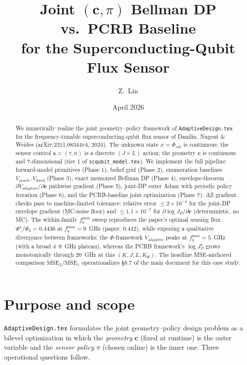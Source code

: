 \documentclass[11pt,a4paper]{article}
\title{Joint $(\bm c, \pi)$ Bellman DP vs.\ PCRB Baseline\\
       for the Superconducting-Qubit Flux Sensor}
\author{Z.\ Lin}
\date{April 2026}
\newcommand{\Phizero}{\Phi_0}
\begin{document}
\maketitle

\begin{abstract}
We numerically realize the joint geometry--policy framework of \texttt{AdaptiveDesign.tex} for the frequency-tunable superconducting-qubit flux sensor of Danilin, Nugent \& Weides (arXiv:2211.08344v4, 2024).  The unknown state $x = \Phi_{\mathrm{ext}}$ is continuous; the sensor control $\bm s = (\tau, n)$ is a discrete $(J\!\times\!L)$ action; the geometry $\bm c$ is continuous and $7$-dimensional (tier 1 of \texttt{scqubit\_model.tex}).  We implement the full pipeline: forward-model primitives (Phase 1), belief grid (Phase 2), enumeration baselines $V_{\text{oracle}}, V_{\text{fixed}}$ (Phase 3), exact memoized Bellman DP (Phase 4), envelope-theorem $\partial V_{\text{adaptive}}/\partial \bm c$ pathwise gradient (Phase 5), joint-DP outer Adam with periodic policy iteration (Phase 6), and the PCRB-baseline joint optimization (Phase 7).  All gradient checks pass to machine-limited tolerance: relative error $\le 2\!\times\!10^{-4}$ for the joint-DP envelope gradient (MC-noise floor) and $\le 1.1\!\times\!10^{-7}$ for $\partial\log J_P/\partial\bm c$ (deterministic, no MC).  The within-family $f_q^{\max}$ sweep reproduces the paper's optimal sensing flux $\Phi^\star/\Phizero = 0.4436$ at $f_q^{\max} = 9$~GHz (paper: $0.442$), while exposing a qualitative divergence between frameworks: the $\Phi$-framework $V_{\text{adaptive}}$ peaks at $f_q^{\max} = 5$~GHz (with a broad 4--9~GHz plateau), whereas the PCRB framework's $\log J_P^\star$ grows monotonically through $20$~GHz at this $(K, J, L, K_\Phi)$.  The headline MSE-anchored comparison $\overline{\mathrm{MSE}}_2 / \overline{\mathrm{MSE}}_1$ operationalizes \S8.7 of the main document for this case study.
\end{abstract}

\tableofcontents

\section{Purpose and scope}
\label{sec:purpose}

\texttt{AdaptiveDesign.tex} formulates the joint geometry--policy design problem as a bilevel optimization in which the \emph{geometry} $\bm c$ (fixed at runtime) is the outer variable and the \emph{sensor policy} $\pi$ (chosen online) is the inner one.  Three operational questions follow.
\end{document}
